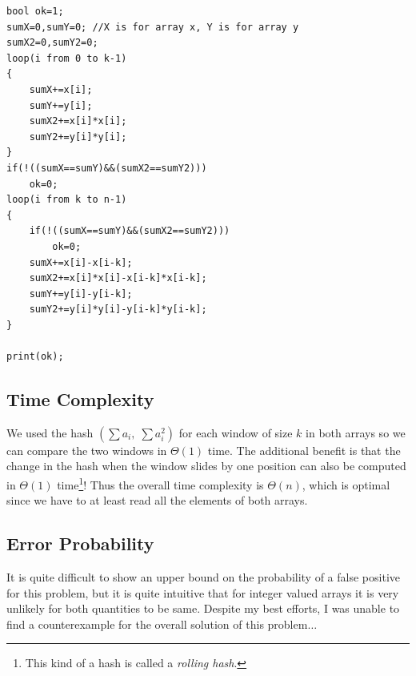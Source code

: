 \begin{center}
\begin{minipage}{0.9\linewidth}
\begin{framed}
\begin{Verbatim}
bool ok=1;
sumX=0,sumY=0; //X is for array x, Y is for array y
sumX2=0,sumY2=0; 
loop(i from 0 to k-1)
{
    sumX+=x[i];
    sumY+=y[i];
    sumX2+=x[i]*x[i];
    sumY2+=y[i]*y[i];
}
if(!((sumX==sumY)&&(sumX2==sumY2)))
	ok=0;
loop(i from k to n-1)
{
    if(!((sumX==sumY)&&(sumX2==sumY2)))
		ok=0;
    sumX+=x[i]-x[i-k];
    sumX2+=x[i]*x[i]-x[i-k]*x[i-k];
    sumY+=y[i]-y[i-k];
    sumY2+=y[i]*y[i]-y[i-k]*y[i-k];
}

print(ok);
\end{Verbatim}
\vspace{-4mm}
\end{framed}
\end{minipage}
\end{center}

\subsection{Time Complexity}

We used the hash $\left(\sum a_i,\;\sum a_i^2\right)$ for each 
window of size $k$ in both arrays so we can compare the two windows in $\Theta(1)$ time. The additional 
benefit is that the change in the hash when the window slides by one position 
can also be computed in $\Theta(1)$ time\footnote{This kind of a hash is called a \emph{rolling hash}.}! Thus 
the overall time complexity is $\Theta(n)$, which is optimal since we have to at least read 
all the elements of both arrays.\\

\subsection{Error Probability}
It is quite difficult to show an upper bound on the probability of a false positive for this 
problem, but it is quite intuitive that for integer valued arrays it is very unlikely for 
both quantities to be same. Despite my best efforts, I was unable to find a counterexample for 
the overall solution of this problem$\dots$ 

\clearpage
